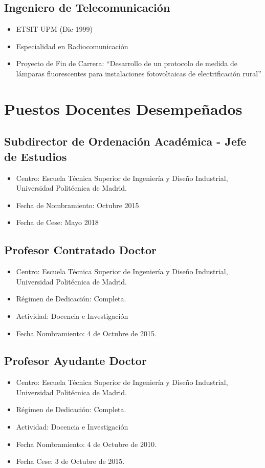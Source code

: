 \documentclass[article, a4paper]{memoir}
\begin{document}
\subsection{Ingeniero de Telecomunicación}
\label{sec:org747aff8}
\begin{itemize}
\item ETSIT-UPM (Dic-1999)
\item Especialidad en Radiocomunicación
\item Proyecto de Fin de Carrera: ``Desarrollo de un protocolo de medida de lámparas fluorescentes para instalaciones fotovoltaicas de electrificación rural''
\end{itemize}

\newpage

\section{Puestos Docentes Desempeñados}
\label{sec:orgb6b17ba}
\subsection{Subdirector de Ordenación Académica - Jefe de Estudios}
\label{sec:org6e94d4d}
\begin{itemize}
\item Centro: Escuela Técnica Superior de Ingeniería y Diseño Industrial, Universidad Politécnica de Madrid.
\item Fecha de Nombramiento: Octubre 2015
\item Fecha de Cese: Mayo 2018
\end{itemize}

\subsection{Profesor Contratado Doctor}
\label{sec:org60275d1}
\begin{itemize}
\item Centro: Escuela Técnica Superior de Ingeniería y Diseño Industrial, Universidad Politécnica de Madrid.
\item Régimen de Dedicación: Completa.
\item Actividad: Docencia e Investigación
\item Fecha Nombramiento: 4 de Octubre de 2015.
\end{itemize}

\subsection{Profesor Ayudante Doctor}
\label{sec:org9c4a57a}
\begin{itemize}
\item Centro: Escuela Técnica Superior de Ingeniería y Diseño Industrial, Universidad Politécnica de Madrid.
\item Régimen de Dedicación: Completa.
\item Actividad: Docencia e Investigación
\item Fecha Nombramiento: 4 de Octubre de 2010.
\item Fecha Cese: 3 de Octubre de 2015.
\end{itemize}
\end{document}
